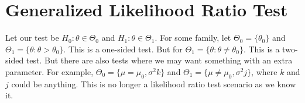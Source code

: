 \documentclass[titlepage, 12pt, leqno]{article}
\begin{document}
\pagebreak

\section{Generalized Likelihood Ratio Test}
Let our test be $H_{0}:\theta \in \Theta_{0}$ and $H_{1}:\theta \in \Theta_{1}$.
For some family, let $\Theta_{0} = \{\theta_{0}\}$ and $\Theta_{1} = \{\theta :
\theta > \theta_{0}\}$. This is a one-sided test. But for $\Theta_{1} =
\{\theta : \theta \ne \theta_{0}\}$. This is a two-sided test. But there are
also tests where we may want something with an extra parameter. For example,
$\Theta_{0} = \{\mu = \mu_{0}, \sigma^{2}k\}$ and $\Theta_{1} = \{\mu \ne
\mu_{0}, \sigma^{2}j\}$, where $k$ and $j$ could be anything. This is no longer
a likelihood ratio test scenario as we know it.
\end{document}
